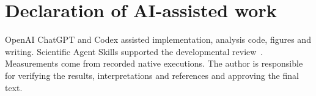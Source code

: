 \documentclass[final,5p,times,twocolumn]{elsarticle}
\begin{document}
\section*{Declaration of AI-assisted work}
OpenAI ChatGPT and Codex assisted implementation, analysis code, figures and writing. Scientific Agent Skills supported the developmental review~\cite{scientificskills}. Measurements come from recorded native executions. The author is responsible for verifying the results, interpretations and references and approving the final text.

\balance

\clearpage
\appendix

\end{document}
